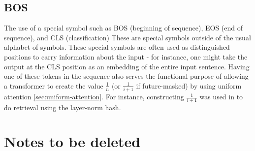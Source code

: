 \subsection{BOS}\label{sec:BOS}

The use of a special symbol such as BOS (beginning of sequence), EOS (end of sequence), and CLS (classification) These are special symbols outside of the usual alphabet of symbols. These special symbols are often used as distinguished positions to carry information about the input - for instance, one might take the output at the CLS position as an embedding of the entire input sentence. Having one of these tokens in the sequence also serves the functional purpose of allowing a transformer to create the value $\frac{1}{n}$ (or $\frac{1}{i+1}$ if future-masked) by using uniform attention \cref{sec:uniform-attention}. For instance, constructing $\frac{1}{i+1}$ was used in \citet{merrill-sabharwal-2024-cot} to do retrieval using the layer-norm hash.



\section{Notes to be deleted}



